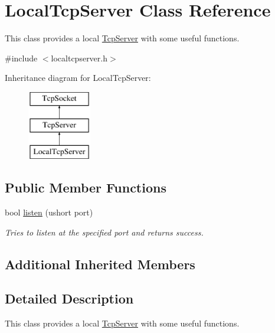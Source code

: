 \hypertarget{class_local_tcp_server}{}\section{Local\+Tcp\+Server Class Reference}
\label{class_local_tcp_server}


This class provides a local \mbox{\hyperlink{class_tcp_server}{Tcp\+Server}} with some useful functions.  




{\ttfamily \#include $<$localtcpserver.\+h$>$}

Inheritance diagram for Local\+Tcp\+Server\+:\begin{figure}[H]
\begin{center}
\leavevmode
\includegraphics[height=3.000000cm]{class_local_tcp_server}
\end{center}
\end{figure}
\subsection*{Public Member Functions}
\begin{DoxyCompactItemize}
\item 
bool \mbox{\hyperlink{class_local_tcp_server_a47116fc33d74d8b3a9b472af6ce8d32d}{listen}} (ushort port)
\begin{DoxyCompactList}\small\item\em Tries to listen at the specified port and returns success. \end{DoxyCompactList}\end{DoxyCompactItemize}
\subsection*{Additional Inherited Members}


\subsection{Detailed Description}
This class provides a local \mbox{\hyperlink{class_tcp_server}{Tcp\+Server}} with some useful functions. 


